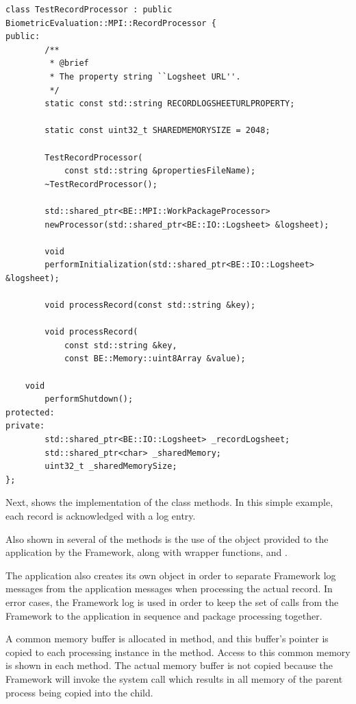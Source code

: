 \begin{lstlisting}[caption={MPI Framework Application Classes}, label=lst:mpiappclasses]
class TestRecordProcessor : public BiometricEvaluation::MPI::RecordProcessor {
public:
        /**
         * @brief
         * The property string ``Logsheet URL''.
         */
        static const std::string RECORDLOGSHEETURLPROPERTY;

        static const uint32_t SHAREDMEMORYSIZE = 2048;

        TestRecordProcessor(
            const std::string &propertiesFileName);
        ~TestRecordProcessor();

        std::shared_ptr<BE::MPI::WorkPackageProcessor>
        newProcessor(std::shared_ptr<BE::IO::Logsheet> &logsheet);

        void
        performInitialization(std::shared_ptr<BE::IO::Logsheet> &logsheet);

        void processRecord(const std::string &key);

        void processRecord(
            const std::string &key,
            const BE::Memory::uint8Array &value);

	void
        performShutdown();
protected:
private:
        std::shared_ptr<BE::IO::Logsheet> _recordLogsheet;
        std::shared_ptr<char> _sharedMemory;
        uint32_t _sharedMemorySize;
};

\end{lstlisting}

Next,  shows the implementation of the class methods. In
this simple example, each record is acknowledged with a log entry.

Also shown in several of the methods is the use of the  object
provided to the application by the Framework, along with wrapper functions,
 and .

The application also creates its own
 object in order to separate Framework log messages from the
application messages when processing the actual record. In error cases, the
Framework log is used in order to keep the set of calls from the Framework
to the application in sequence and package processing together.

A common memory buffer is allocated in  method,
and this buffer's pointer is copied to each processing instance in the
 method. Access to this common memory is shown in each
 method. The actual memory buffer is not copied because
the Framework will invoke the system call  which results in all
memory of the parent process being copied into the child. 


